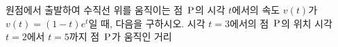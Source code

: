 원점에서 출발하여 수직선 위를 움직이는 점~$\mathrm{P}$의 시각 $t$에서의 속도 $v(t)$가 $v(t)=(1-t)e^t$일 때, 다음을 구하시오.
 시각 $t=3$에서의 점~$\mathrm{P}$의 위치
 시각 $t=2$에서 $t=5$까지 점~$\mathrm{P}$가 움직인 거리
